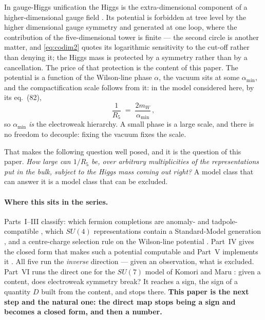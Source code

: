 \documentclass[11pt,a4paper]{article}
\newcommand{\su}[1]{SU(#1)}
\newcommand{\amin}{\alpha_{\min}}
\begin{document}
In gauge-Higgs unification the Higgs is the extra-dimensional component of a higher-dimensional
gauge field \cite{Manton,Hosotani}. Its potential is forbidden at tree level by the higher
dimensional gauge symmetry and generated at one loop, where the contribution of the
five-dimensional tower is finite --- the second circle is another matter, and \eqref{eq:codim2}
quotes its logarithmic sensitivity to the cut-off rather than denying it; the Higgs mass is
protected by a symmetry rather than by a cancellation. The price of that protection is the content
of this paper. The potential is a function of the Wilson-line phase $\alpha$, the vacuum sits at
some $\amin$, and the compactification scale follows from it: in the model considered here,
by its eq.~(82),
\begin{equation}\label{eq:hier}
  \frac{1}{R_5} \;=\; \frac{2 m_W}{\amin}\,,
\end{equation}
so $\amin$ \emph{is} the electroweak hierarchy. A small phase is a large scale, and there is no
freedom to decouple: fixing the vacuum fixes the scale.

That makes the following question well posed, and it is the question of this paper. \emph{How large
can $1/R_5$ be, over arbitrary multiplicities of the representations \cite{KM25} put in the bulk,
subject to the Higgs mass coming
out right?} A model class that can answer it is a model class that can be excluded.

\paragraph{Where this sits in the series.} Parts~I--III classify: which fermion completions are
anomaly- and tadpole-compatible \cite{PartI}, which $\su4$ representations contain a Standard-Model
generation \cite{PartII}, and a centre-charge selection rule on the Wilson-line potential
\cite{PartIII}. Part~IV gives the closed form that makes such a potential computable \cite{PartIV}
and Part~V implements it \cite{PartV}. All five run the \emph{inverse} direction --- given an
observation, what is excluded. Part~VI \cite{PartVI} runs the direct one for the $\su7$ model of
Komori and Maru \cite{KM25}: given a content, does electroweak symmetry break? It reaches a sign,
the sign of a quantity $D$ built from the content, and stops there. \textbf{This paper is the next
step and the natural one: the direct map stops being a sign and becomes a closed form, and then a
number.}
\end{document}
